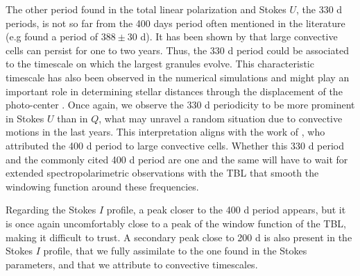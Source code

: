 \documentclass{aa}
\begin{document}
The other period found in the total linear polarization and Stokes $U$, the 330 d periods, is not so far from the 400 days period often mentioned in the literature (e.g \cite{kiss_variability_2006} found a period of $388 \pm 30$ d). It has been shown by \cite{lopez_ariste_convective_2018} that large convective cells can persist for one to two years. Thus, the 330 d period could be associated to the timescale on which the largest granules evolve. This characteristic timescale has also been observed in the numerical simulations and might play an important role in determining stellar distances through the displacement of the photo-center \citep{chiavassa_probing_2022}. Once again, we observe the 330 d periodicity to be more prominent in Stokes $U$ than in $Q$, what may unravel a random situation due to convective motions in the last years. This interpretation aligns with the work of \cite{gray_mass_2008}, who attributed the 400 d period to 
large convective cells. Whether this 330 d period and the commonly cited 400 d period are one and the same will have to wait for extended spectropolarimetric observations with the TBL that smooth the windowing function around these frequencies.

Regarding the Stokes $I$ profile, a peak closer to the 400 d period appears, but it is once again uncomfortably close 
to a peak of the window function of the TBL, making it difficult to trust. A secondary peak close to 200 d is also present in the Stokes $I$ profile, that we fully assimilate to the one found in the Stokes parameters, and that  we attribute to convective timescales. 
\end{document}
